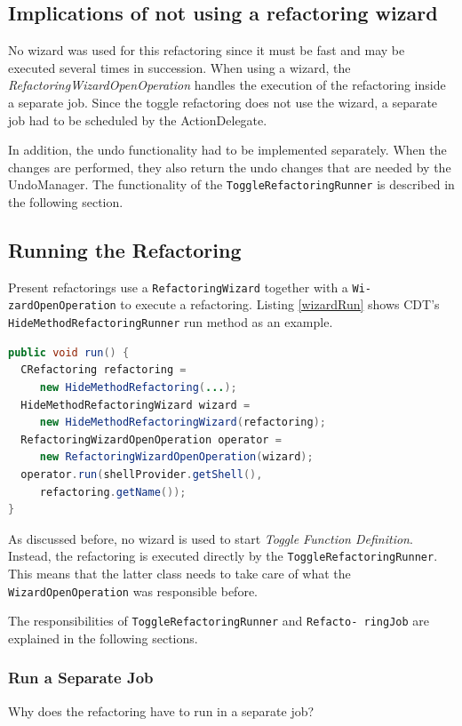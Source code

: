 \subsection{Implications of not using a refactoring wizard}
No wizard was used for this refactoring since it must be fast and may be 
executed several times in succession. When using a wizard, the 
\textit{RefactoringWizardOpenOperation} handles the execution of the refactoring 
inside a separate job. Since the toggle refactoring does not use the wizard, a 
separate job had to be scheduled by the ActionDelegate.

In addition, the undo functionality had to be implemented separately. When the 
changes are performed, they also return the undo changes that are needed by the
UndoManager. The functionality of the \texttt{ToggleRefactoringRunner} is
described in the following section.

\subsection{Running the Refactoring}\label{runnersec}
Present refactorings use a \texttt{RefactoringWizard} together with a 
\texttt{Wi- zardOpenOperation} to execute a refactoring. Listing \ref{wizardRun} 
shows CDT's \texttt{HideMethodRefactoringRunner} run method as an example.

\begin{lstlisting}[caption={shorted run method of HideMethodRefactoringRunner},label={wizardRun}, language=Java]
public void run() {
  CRefactoring refactoring = 
     new HideMethodRefactoring(...);
  HideMethodRefactoringWizard wizard = 
     new HideMethodRefactoringWizard(refactoring);
  RefactoringWizardOpenOperation operator = 
     new RefactoringWizardOpenOperation(wizard);
  operator.run(shellProvider.getShell(), 
     refactoring.getName());
}
\end{lstlisting}

As discussed before, no wizard is used to start \textit{Toggle Function 
Definition}. Instead, the refactoring is executed directly by the 
\texttt{ToggleRefactoringRunner}. This means that the latter class needs to take 
care of what the \texttt{WizardOpenOperation} was responsible before.

The responsibilities of \texttt{ToggleRefactoringRunner} and 
\texttt{Refacto- ringJob} are explained in the following sections.

\subsubsection{Run a Separate Job}
Why does the refactoring have to run in a separate job?

